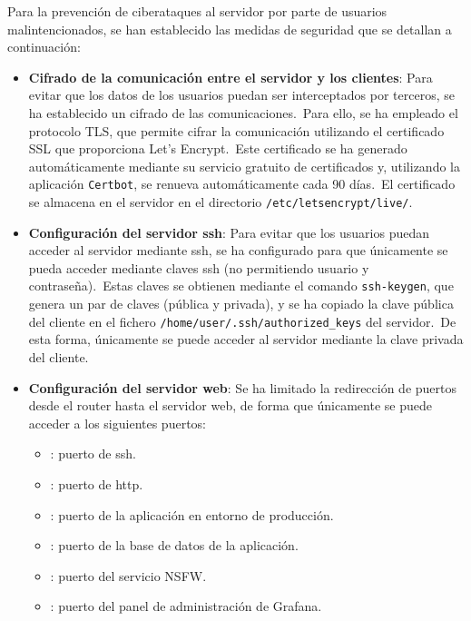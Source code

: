 
Para la prevención de ciberataques al servidor por parte de usuarios malintencionados, se han
establecido las medidas de seguridad que se detallan a continuación:

\begin{itemize}
	\item \textbf{Cifrado de la comunicación entre el servidor y los clientes}: Para evitar que los datos de los
	usuarios puedan ser interceptados por terceros, se ha establecido un cifrado de las comunicaciones.\ Para ello, se
	ha empleado el protocolo TLS, que permite cifrar la comunicación utilizando el certificado SSL que proporciona
	Let's Encrypt.\ Este certificado se ha generado automáticamente mediante su servicio gratuito de certificados y,
	utilizando la aplicación \texttt{Certbot}, se renueva automáticamente cada 90 días.\ El certificado se
	almacena en el servidor en el directorio \texttt{/etc/letsencrypt/live/}.

	\item \textbf{Configuración del servidor ssh}: Para evitar que los usuarios puedan acceder al servidor mediante
	ssh, se ha configurado para que únicamente se pueda acceder mediante claves ssh (no permitiendo usuario y
	contraseña).\ Estas claves se obtienen mediante el comando \texttt{ssh-keygen}, que genera un par de claves
	(pública y privada), y se ha copiado la clave pública del cliente en el fichero
	\texttt{/home/user/.ssh/authorized\_keys} del servidor.\ De esta forma, únicamente se puede acceder al servidor
	mediante la
	clave privada del cliente.

	\item \textbf{Configuración del servidor web}: Se ha limitado la redirección de puertos desde el router hasta el
	servidor web, de forma que únicamente se puede acceder a los siguientes puertos:

	\begin{itemize}
		\item {}: puerto de ssh.
		\item {}: puerto de http.
		\item {}: puerto de la aplicación en entorno de producción.
		\item {}: puerto de la base de datos de la aplicación.
		\item {}: puerto del servicio NSFW\@.
		\item {}: puerto del panel de administración de Grafana.
	\end{itemize}


\end{itemize}
